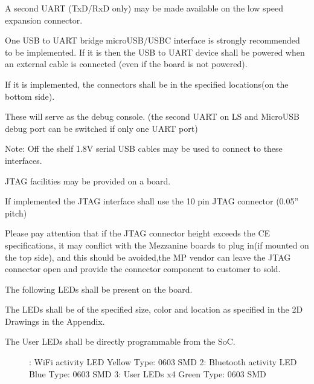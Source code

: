 \documentclass[a4paper,10pt,oneside,english]{sphinxmanual}
\begin{document}
\sphinxAtStartPar
A second UART (TxD/RxD only) may be made available on the low speed expansion connector.

\sphinxAtStartPar
{}

\sphinxAtStartPar
One USB to UART bridge microUSB/USB\sphinxhyphen{}C interface is strongly recommended to be implemented. If it is then the USB to UART device shall be powered when an external cable is connected (even if the board is not powered).

\sphinxAtStartPar
If it is implemented, the connectors shall be in the specified locations(on the bottom side).

\sphinxAtStartPar
These will serve as the debug console. (the second UART on LS and MicroUSB debug port can be switched if only one UART port)

\sphinxAtStartPar
Note: Off the shelf 1.8V serial USB cables may be used to connect to these interfaces.

\sphinxAtStartPar
{}

\sphinxAtStartPar
JTAG facilities may be provided on a board.

\sphinxAtStartPar
If implemented the JTAG interface shall use the 10 pin JTAG connector (0.05” pitch)

\sphinxAtStartPar
Please pay attention that if the JTAG connector height exceeds the CE specifications, it may conflict with the Mezzanine boards to plug in(if mounted on the top side), and this should be avoided,the MP vendor can leave the JTAG connector open and provide the connector component to customer to sold.

\sphinxAtStartPar
{}

\sphinxAtStartPar
{}

\sphinxAtStartPar
{}

\sphinxAtStartPar
The following LEDs shall be present on the board.

\sphinxAtStartPar
The LEDs shall be of the specified size, color and location as specified in the 2D Drawings in the Appendix.
\begin{description}
\item[{The User LEDs shall be directly programmable from the SoC.}] \leavevmode
{}: WiFi activity LED         Yellow  Type: 0603 SMD
2: Bluetooth activity LED    Blue    Type: 0603 SMD
3: User LEDs x4                      Green   Type: 0603 SMD

\end{description}
\end{document}
